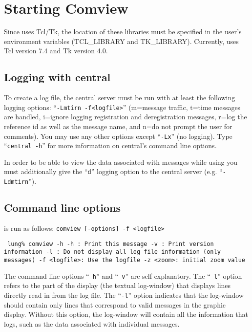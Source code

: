 \section{Starting Comview}

Since \comview{} uses Tcl/Tk, the location of these libraries must be
specified in the user's environment variables (TCL\_LIBRARY and
TK\_LIBRARY). Currently, \comview{} uses Tcl version 7.4 and Tk version
4.0.

\subsection{Logging with central}

To create a log file, the \system{} central server must be run with at least
the following logging options: ``{\tt-Lmtirn -f<logfile>}'' (m=message
traffic, t=time messages are handled, i=ignore logging registration
and deregistration messages, r=log the reference id as well as the
message name, and n=do not prompt the user for comments). You may use any other options except ``{\tt-Lx}'' (no
logging). Type ``{\tt central -h}'' for more information on central's
command line options.

In order to be able to view the data associated with messages while
using \comview{} you must additionally give the ``{\tt d}'' logging option to
the central server (e.g. ``{\tt -Ldmtirn}'').

\subsection{Command line options}

\comview{} is run as follows: {\tt comview [-options] -f <logfile>}

{\tt
lung\% comview -h\newline
-h : Print this message\newline
-v : Print version information\newline
-l : Do not display all log file information (only messages)\newline
-f <logfile>: Use the logfile\newline
-z <zoom>: initial zoom value}\newline

The command line options ``{\tt -h}'' and ``{\tt -v}'' are self-explanatory.
The ``{\tt -l}'' option refers to the part of the \comview{} display (the
textual log-window) that
displays lines directly read in from the \system{} log
file. The ``{\tt -l}'' option indicates that the log-window should contain
only lines that correspond to valid messages in the
graphic display. Without this option, the log-window will contain all the
information that \system{} logs, such as
the data associated with individual messages.

